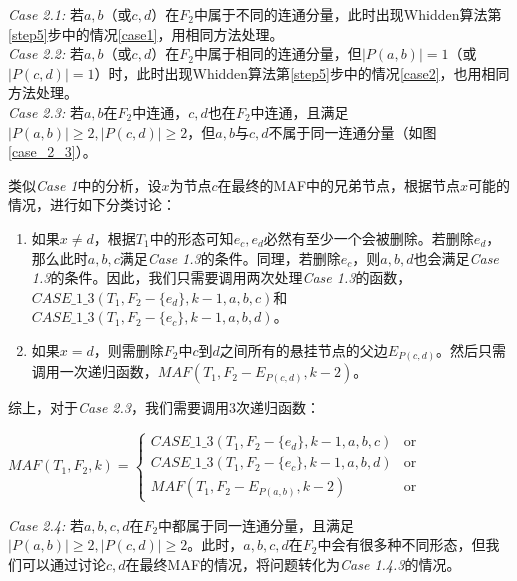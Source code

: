 
\textit{Case 2.1: }若$a,b$（或$c,d$）在$F_2$中属于不同的连通分量，此时出现Whidden算法第\ref{step5}步中的情况\ref{case1}，用相同方法处理。\\

\textit{Case 2.2: }若$a,b$（或$c,d$）在$F_2$中属于相同的连通分量，但$|P(a,b)|=1$（或$|P(c,d)|=1$）时，此时出现Whidden算法第\ref{step5}步中的情况\ref{case2}，也用相同方法处理。\\

\textit{Case 2.3: }若$a,b$在$F_2$中连通，$c,d$也在$F_2$中连通，且满足$|P(a,b)| \ge 2,|P(c,d)| \ge 2$，但$a,b$与$c,d$不属于同一连通分量（如图\ref{case_2_3}）。

类似\textit{Case 1}中的分析，设$x$为节点$c$在最终的MAF中的兄弟节点，根据节点$x$可能的情况，进行如下分类讨论：
\begin{enumerate}
	\item 如果$x \neq d$，根据$T_1$中的形态可知$e_c,e_d$必然有至少一个会被删除。若删除$e_d$，那么此时$a,b,c$满足\textit{Case 1.3}的条件。同理，若删除$e_c$，则$a,b,d$也会满足\textit{Case 1.3}的条件。因此，我们只需要调用两次处理\textit{Case 1.3}的函数，$CASE\_1\_3(T_1,F_2-\{e_d\},k-1,a,b,c)$和$CASE\_1\_3(T_1,F_2-\{e_c\},k-1,a,b,d)$。
	\item 如果$x = d$，则需删除$F_2$中$c$到$d$之间所有的悬挂节点的父边$E_{P(c,d)}$。然后只需调用一次递归函数，$MAF(T_1,F_2-E_{P(c,d)},k-2)$。
\end{enumerate}

综上，对于\textit{Case 2.3}，我们需要调用3次递归函数：
\begin{center}
$MAF(T_1,F_2,k) = \left\{
\begin{array}{lr}
         CASE\_1\_3(T_1,F_2-\{e_d\},k-1,a,b,c) & \mbox{or}\\ 
         CASE\_1\_3(T_1,F_2-\{e_c\},k-1,a,b,d) & \mbox{or}\\
         MAF(T_1,F_2-E_{P(a,b)},k-2) & \mbox{or}
\end{array}
\right.$
\end{center}
$ $\\

\textit{Case 2.4: }若$a,b,c,d$在$F_2$中都属于同一连通分量，且满足$|P(a,b)| \ge 2,|P(c,d)| \ge 2$。此时，$a,b,c,d$在$F_2$中会有很多种不同形态，但我们可以通过讨论$c,d$在最终MAF的情况，将问题转化为\textit{Case 1.4.3}的情况。

